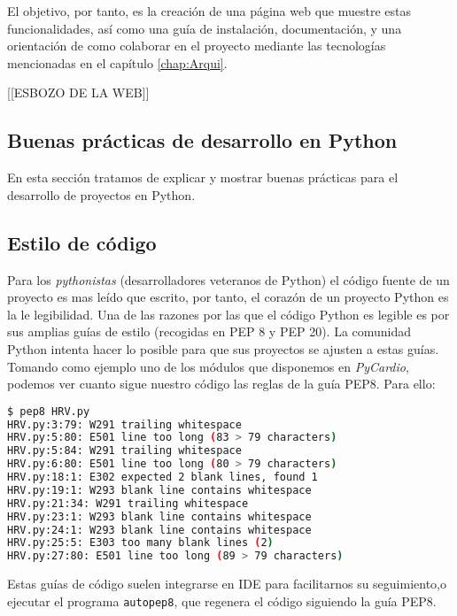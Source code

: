 El objetivo, por tanto, es la creación de una página web que muestre estas funcionalidades, así como una guía de instalación, documentación, y una orientación de como colaborar en el proyecto mediante las tecnologías mencionadas en el capítulo \ref{chap:Arqui}.

[[ESBOZO DE LA WEB]]

\subsection{Buenas prácticas de desarrollo en Python}
\label{subsec:bestPracticses}
En esta sección tratamos de explicar y mostrar buenas prácticas para el desarrollo de proyectos en Python.\\

\subsection*{Estilo de código}
\label{subsec:stylePython}
Para los \emph{pythonistas} (desarrolladores veteranos de Python) el código fuente de un proyecto es mas leído que escrito, por tanto, el corazón de un proyecto Python es la le legibilidad. Una de las razones por las que el código Python es legible es por sus amplias guías de estilo (recogidas en PEP 8 y PEP 20). La comunidad Python intenta hacer lo posible para que sus proyectos se ajusten a estas guías. Tomando como ejemplo uno de los módulos que disponemos en \emph{PyCardio}, podemos ver cuanto sigue nuestro código las reglas de la guía PEP8. Para ello: 
\begin{lstlisting}[language=sh, caption=Ejemplo de PEP8 con \emph{PyCardio},label=pep8]
$ pep8 HRV.py
HRV.py:3:79: W291 trailing whitespace
HRV.py:5:80: E501 line too long (83 > 79 characters)
HRV.py:5:84: W291 trailing whitespace
HRV.py:6:80: E501 line too long (80 > 79 characters)
HRV.py:18:1: E302 expected 2 blank lines, found 1
HRV.py:19:1: W293 blank line contains whitespace
HRV.py:21:34: W291 trailing whitespace
HRV.py:23:1: W293 blank line contains whitespace
HRV.py:24:1: W293 blank line contains whitespace
HRV.py:25:5: E303 too many blank lines (2)
HRV.py:27:80: E501 line too long (89 > 79 characters)
\end{lstlisting}
Estas guías de código suelen integrarse en IDE para facilitarnos su seguimiento,o ejecutar el programa \texttt{autopep8}, que regenera el código siguiendo la guía PEP8.  

